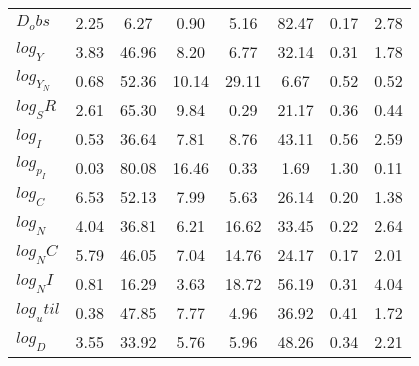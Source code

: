 \begin{center}
\begin{longtable}{lccccccc}
$D_obs     $	 & 	        2.25	 & 	        6.27	 & 	        0.90	 & 	        5.16	 & 	       82.47	 & 	        0.17	 & 	        2.78 \\ 
$log_Y     $	 & 	        3.83	 & 	       46.96	 & 	        8.20	 & 	        6.77	 & 	       32.14	 & 	        0.31	 & 	        1.78 \\ 
$log_Y_N   $	 & 	        0.68	 & 	       52.36	 & 	       10.14	 & 	       29.11	 & 	        6.67	 & 	        0.52	 & 	        0.52 \\ 
$log_SR    $	 & 	        2.61	 & 	       65.30	 & 	        9.84	 & 	        0.29	 & 	       21.17	 & 	        0.36	 & 	        0.44 \\ 
$log_I     $	 & 	        0.53	 & 	       36.64	 & 	        7.81	 & 	        8.76	 & 	       43.11	 & 	        0.56	 & 	        2.59 \\ 
$log_p_I   $	 & 	        0.03	 & 	       80.08	 & 	       16.46	 & 	        0.33	 & 	        1.69	 & 	        1.30	 & 	        0.11 \\ 
$log_C     $	 & 	        6.53	 & 	       52.13	 & 	        7.99	 & 	        5.63	 & 	       26.14	 & 	        0.20	 & 	        1.38 \\ 
$log_N     $	 & 	        4.04	 & 	       36.81	 & 	        6.21	 & 	       16.62	 & 	       33.45	 & 	        0.22	 & 	        2.64 \\ 
$log_NC    $	 & 	        5.79	 & 	       46.05	 & 	        7.04	 & 	       14.76	 & 	       24.17	 & 	        0.17	 & 	        2.01 \\ 
$log_NI    $	 & 	        0.81	 & 	       16.29	 & 	        3.63	 & 	       18.72	 & 	       56.19	 & 	        0.31	 & 	        4.04 \\ 
$log_util  $	 & 	        0.38	 & 	       47.85	 & 	        7.77	 & 	        4.96	 & 	       36.92	 & 	        0.41	 & 	        1.72 \\ 
$log_D     $	 & 	        3.55	 & 	       33.92	 & 	        5.76	 & 	        5.96	 & 	       48.26	 & 	        0.34	 & 	        2.21 \\ 
\end{longtable}
 \end{center}
